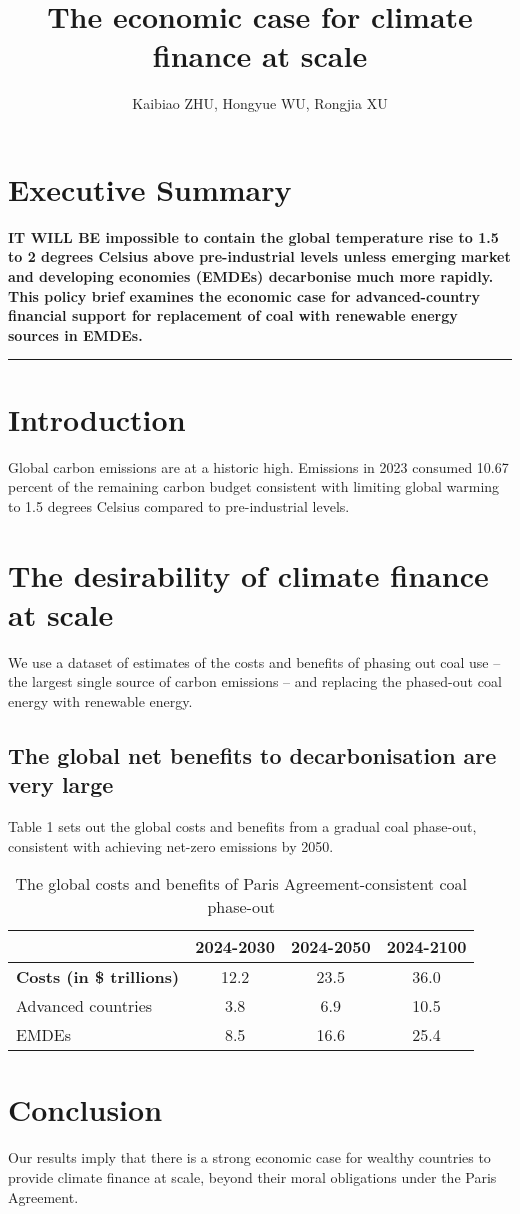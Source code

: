 \documentclass[a4paper,11pt]{article}
\title{\color{highlight}\textbf{The economic case for climate finance at scale}}
\author{Kaibiao ZHU, Hongyue WU, Rongjia XU}
\date{}
\newcommand{\boxedtext}[1]{\noindent\colorbox{highlight!10}{\parbox{\dimexpr\linewidth-2\fboxsep}{#1}}}
\begin{document}
\maketitle

\section*{Executive Summary}
\boxedtext{
\textbf{IT WILL BE impossible to contain the global temperature rise to 1.5 to 2 degrees Celsius above pre-industrial levels unless emerging market and developing economies (EMDEs) decarbonise much more rapidly. This policy brief examines the economic case for advanced-country financial support for replacement of coal with renewable energy sources in EMDEs.}
}

\vspace{1em}
\hrule
\vspace{1.5em}

\section{Introduction}
Global carbon emissions are at a historic high. Emissions in 2023 consumed 10.67 percent of the remaining carbon budget consistent with limiting global warming to 1.5 degrees Celsius compared to pre-industrial levels.

\section{The desirability of climate finance at scale}
We use a dataset of estimates of the costs and benefits of phasing out coal use – the largest single source of carbon emissions – and replacing the phased-out coal energy with renewable energy.

\subsection{The global net benefits to decarbonisation are very large}
Table 1 sets out the global costs and benefits from a gradual coal phase-out, consistent with achieving net-zero emissions by 2050.

\begin{table}[h]
\centering
\caption{The global costs and benefits of Paris Agreement-consistent coal phase-out}
\begin{tabular}{lccc}
\toprule
& 2024-2030 & 2024-2050 & 2024-2100 \\
\midrule
\textbf{Costs (in \$ trillions)} & 12.2 & 23.5 & 36.0 \\
\quad Advanced countries & 3.8 & 6.9 & 10.5 \\
\quad EMDEs & 8.5 & 16.6 & 25.4 \\
\bottomrule
\end{tabular}
\end{table}

\section{Conclusion}
Our results imply that there is a strong economic case for wealthy countries to provide climate finance at scale, beyond their moral obligations under the Paris Agreement.
\end{document}
